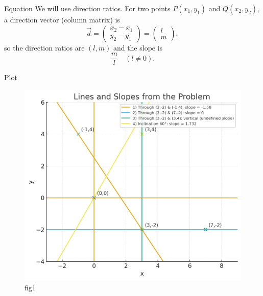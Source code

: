 \documentclass{beamer}
\begin{document}
\begin{frame}{Equation}
We will use direction ratios. For two points \(P(x_1,y_1)\) and \(Q(x_2,y_2)\), a direction vector (column matrix) is
\[
\vec{d}=\begin{pmatrix}x_2-x_1\\[4pt]y_2-y_1\end{pmatrix}=\begin{pmatrix}l\\[4pt]m\end{pmatrix},
\]
so the direction ratios are \((l,m)\) and the slope is 
\[
\frac{m}{l}\quad (l\neq0).
\]
\end{frame}




\begin{frame}{Plot}
 \begin{figure}[H]
     \centering
     \includegraphics[width=0.5\linewidth]{figs/fig1.png}
     \caption{fig1}
     \label{fig:placeholder}
 \end{figure}
     
    
\end{frame}
\end{document}
